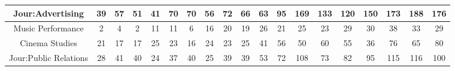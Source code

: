 \documentclass[10pt]{article}
\begin{document}
\begin{landscape}
\begin{longtable}[c]{|ccccccccccccccccccc|}
	\multicolumn{1}{|c|}{Jour:Advertising}                           & \multicolumn{1}{c|}{39}         & \multicolumn{1}{c|}{57}         & \multicolumn{1}{c|}{51}         & \multicolumn{1}{c|}{41}         & \multicolumn{1}{c|}{70}         & \multicolumn{1}{c|}{70}         & \multicolumn{1}{c|}{56}         & \multicolumn{1}{c|}{72}         & \multicolumn{1}{c|}{66}         & \multicolumn{1}{c|}{63}         & \multicolumn{1}{c|}{95}         & \multicolumn{1}{c|}{169}        & \multicolumn{1}{c|}{133}        & \multicolumn{1}{c|}{120}        & \multicolumn{1}{c|}{150}        & \multicolumn{1}{c|}{173}        & \multicolumn{1}{c|}{188}        & 176        \\ \hline
	\multicolumn{1}{|c|}{Music Performance}                          & \multicolumn{1}{c|}{2}          & \multicolumn{1}{c|}{4}          & \multicolumn{1}{c|}{2}          & \multicolumn{1}{c|}{11}         & \multicolumn{1}{c|}{11}         & \multicolumn{1}{c|}{6}          & \multicolumn{1}{c|}{16}         & \multicolumn{1}{c|}{20}         & \multicolumn{1}{c|}{19}         & \multicolumn{1}{c|}{26}         & \multicolumn{1}{c|}{21}         & \multicolumn{1}{c|}{25}         & \multicolumn{1}{c|}{23}         & \multicolumn{1}{c|}{29}         & \multicolumn{1}{c|}{30}         & \multicolumn{1}{c|}{38}         & \multicolumn{1}{c|}{33}         & 29         \\ \hline
	\multicolumn{1}{|c|}{Cinema Studies}                             & \multicolumn{1}{c|}{21}         & \multicolumn{1}{c|}{17}         & \multicolumn{1}{c|}{17}         & \multicolumn{1}{c|}{25}         & \multicolumn{1}{c|}{23}         & \multicolumn{1}{c|}{16}         & \multicolumn{1}{c|}{24}         & \multicolumn{1}{c|}{23}         & \multicolumn{1}{c|}{25}         & \multicolumn{1}{c|}{41}         & \multicolumn{1}{c|}{56}         & \multicolumn{1}{c|}{50}         & \multicolumn{1}{c|}{60}         & \multicolumn{1}{c|}{55}         & \multicolumn{1}{c|}{36}         & \multicolumn{1}{c|}{76}         & \multicolumn{1}{c|}{65}         & 80         \\ \hline
	\multicolumn{1}{|c|}{Jour:Public Relations}                      & \multicolumn{1}{c|}{28}         & \multicolumn{1}{c|}{41}         & \multicolumn{1}{c|}{40}         & \multicolumn{1}{c|}{24}         & \multicolumn{1}{c|}{37}         & \multicolumn{1}{c|}{40}         & \multicolumn{1}{c|}{25}         & \multicolumn{1}{c|}{39}         & \multicolumn{1}{c|}{39}         & \multicolumn{1}{c|}{53}         & \multicolumn{1}{c|}{72}         & \multicolumn{1}{c|}{108}        & \multicolumn{1}{c|}{73}         & \multicolumn{1}{c|}{82}         & \multicolumn{1}{c|}{95}         & \multicolumn{1}{c|}{115}        & \multicolumn{1}{c|}{116}        & 100        \\ \hline

\end{longtable}
\end{landscape}
\end{document}
